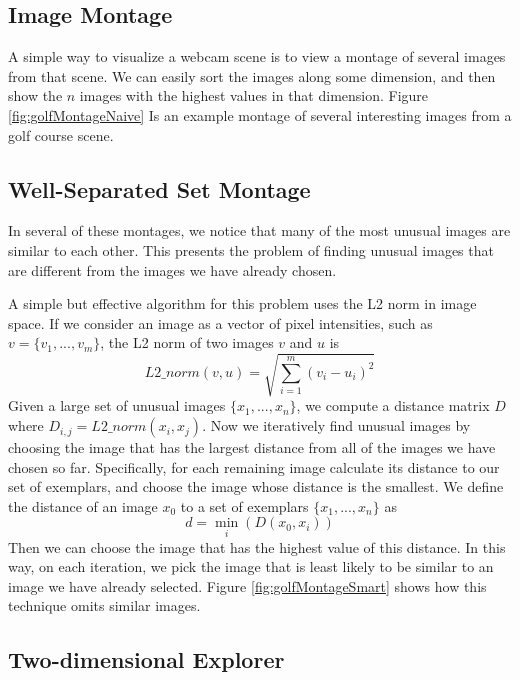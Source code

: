 \subsection{Image Montage}

A simple way to visualize a webcam scene is to view a montage of several images from that scene.  We can easily sort the images along some dimension, and then show the $n$ images with the highest values in that dimension.  Figure \ref{fig:golfMontageNaive} Is an example montage of several interesting images from a golf course scene.

\subsection{Well-Separated Set Montage}

In several of these montages, we notice that many of the most unusual images are similar to each other.  This presents the problem of finding unusual images that are different from the images we have already chosen.

A simple but effective algorithm for this problem uses the L2 norm in image space.  If we consider an image as a vector of pixel intensities, such as $v = \{v_1, ..., v_m\}$, the L2 norm of two images $v$ and $u$ is $$L2\_norm(v,u) = \sqrt{\sum_{i=1}^m{(v_i-u_i)^2}}$$  Given a large set of unusual images $\{x_1, ..., x_n\}$, we compute a distance matrix $D$ where $D_{i,j} = L2\_norm(x_i, x_j).$  Now we iteratively find unusual images by choosing the image that has the largest distance from all of the images we have chosen so far.  Specifically, for each remaining image calculate its distance to our set of exemplars, and choose the image whose distance is the smallest.  We define the distance of an image $x_0$ to a set of exemplars $\{x_1, ..., x_n\}$ as $$d = \min_i(D(x_0, x_i))$$Then we can choose the image that has the highest value of this distance.  In this way, on each iteration, we pick the image that is least likely to be similar to an image we have already selected.  Figure \ref{fig:golfMontageSmart} shows how this technique omits similar images.

\subsection{Two-dimensional Explorer}

